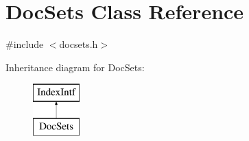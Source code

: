 \hypertarget{class_doc_sets}{}\section{Doc\+Sets Class Reference}
\label{class_doc_sets}


{\ttfamily \#include $<$docsets.\+h$>$}

Inheritance diagram for Doc\+Sets\+:\begin{figure}[H]
\begin{center}
\leavevmode
\includegraphics[height=2.000000cm]{class_doc_sets}
\end{center}
\end{figure}
